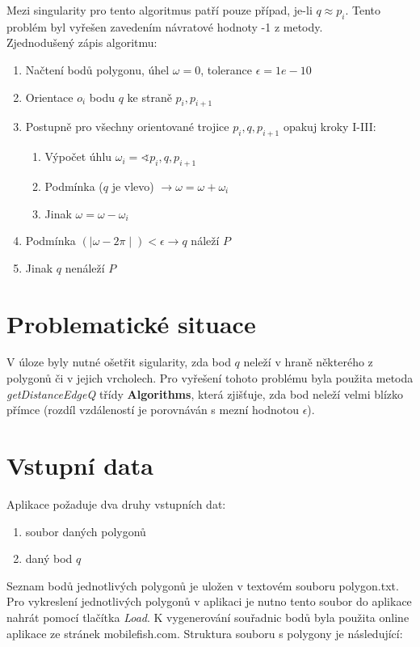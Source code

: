 \documentclass[a4paper, 12pt]{article}
\begin{document}
Mezi singularity pro tento algoritmus patří pouze případ, je-li $q\approx p_i$. Tento problém byl vyřešen zavedením návratové hodnoty -1 z metody.\\

Zjednodušený zápis algoritmu:

\begin{enumerate}
\item Načtení bodů polygonu, úhel $\omega = 0$, tolerance $\epsilon = 1e-10$
\item Orientace $o_i$ bodu $q$ ke straně $p_i, p_{i+1}$
\item Postupně pro všechny orientované trojice $p_i, q, p_{i+1}$ opakuj kroky I-III:
\begin{enumerate}[label=\Roman*.]
\item Výpočet úhlu $\omega_i = \sphericalangle p_i, q, p_{i+1}$
\item Podmínka ($q$ je vlevo) $\rightarrow \omega = \omega + \omega_i$
\item Jinak $\omega = \omega - \omega_i$
\end{enumerate}
\item Podmínka $(\mid \omega - 2\pi \mid) < \epsilon \rightarrow q$ náleží $P$
\item Jinak  $q$ nenáleží $P$
\end{enumerate}

\section{Problematické situace}
V úloze byly nutné ošetřit sigularity, zda bod $q$ neleží v hraně některého z polygonů či v jejich vrcholech. Pro vyřešení tohoto problému byla použita metoda \textsl{getDistanceEdgeQ} třídy \textbf{Algorithms}, která zjišťuje, zda bod neleží velmi blízko přímce (rozdíl vzdáleností je porovnáván s mezní hodnotou $\epsilon$).

\section{Vstupní data}
Aplikace požaduje dva druhy vstupních dat:

\begin{enumerate}
\item soubor daných polygonů
\item daný bod $q$
\end{enumerate}

Seznam bodů jednotlivých polygonů je uložen v textovém souboru polygon.txt. Pro vykreslení jednotlivých polygonů v aplikaci je nutno tento soubor do aplikace nahrát pomocí tlačítka \textsl{Load}. K vygenerování souřadnic bodů byla použita online aplikace ze stránek mobilefish.com. Struktura souboru s polygony je následující:\\
\end{document}
